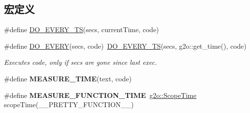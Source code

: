 \subsection*{宏定义}
\begin{DoxyCompactItemize}
\item 
\#define \hyperlink{group__utils_ga9b9f34c01b03b47644c2762bf256be32}{D\-O\-\_\-\-E\-V\-E\-R\-Y\-\_\-\-T\-S}(secs, current\-Time, code)
\item 
\hypertarget{group__utils_gabfe958da8833edbe74250507adc61635}{\#define \hyperlink{group__utils_gabfe958da8833edbe74250507adc61635}{D\-O\-\_\-\-E\-V\-E\-R\-Y}(secs, code)~\hyperlink{group__utils_ga9b9f34c01b03b47644c2762bf256be32}{D\-O\-\_\-\-E\-V\-E\-R\-Y\-\_\-\-T\-S}(secs, g2o\-::get\-\_\-time(), code)}\label{group__utils_gabfe958da8833edbe74250507adc61635}

\begin{DoxyCompactList}\small\item\em Executes code, only if secs are gone since last exec. \end{DoxyCompactList}\item 
\#define {\bfseries M\-E\-A\-S\-U\-R\-E\-\_\-\-T\-I\-M\-E}(text, code)
\item 
\hypertarget{group__utils_gae79acf8eb730f80c029d60e19332b4b9}{\#define {\bfseries M\-E\-A\-S\-U\-R\-E\-\_\-\-F\-U\-N\-C\-T\-I\-O\-N\-\_\-\-T\-I\-M\-E}~\hyperlink{classg2o_1_1ScopeTime}{g2o\-::\-Scope\-Time} scope\-Time(\-\_\-\-\_\-\-P\-R\-E\-T\-T\-Y\-\_\-\-F\-U\-N\-C\-T\-I\-O\-N\-\_\-\-\_\-)}\label{group__utils_gae79acf8eb730f80c029d60e19332b4b9}

\end{DoxyCompactItemize}
